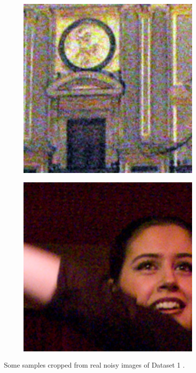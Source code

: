 \begin{figure}
\begin{subfigure}[t]{0.19\textwidth}
    \end{subfigure}
    \hfill
    \begin{subfigure}[t]{0.19\textwidth}
        \centering
        \includegraphics[width=1\textwidth]{images/guided/resize_palace.png}
    \end{subfigure}
    \hfill
    \begin{subfigure}[t]{0.19\textwidth}
        \centering
        \includegraphics[width=1\textwidth]{images/guided/resize_woman.png}
    \end{subfigure}
    \caption{Some samples cropped from real noisy images of Dataset 1 \cite{ncwebsite}.}
    \label{fig3}
\end{figure}

